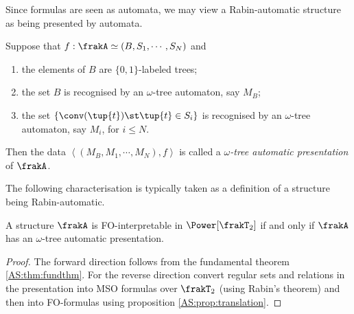 Since formulas are seen as automata, we may view a Rabin-automatic structure as being presented by automata.


\begin{definition} \label{AS:dfn:rap} 
Suppose that $f: \frakA \simeq  (B,S_1,\cdots,S_N)$ and
\begin{enumerate}
\item the elements of $B$ are $\{0,1\}$-labeled trees;
\item the set $B$ is recognised by an $\omega$-tree automaton, say $M_B$; 
\item the set $\{\conv(\tup{t}) \st \tup{t} \in S_i\}$ is recognised by an $\omega$-tree automaton, say $M_i$, for $i \leq N$.
\end{enumerate}
Then the data $\left<(M_B,M_1,\cdots,M_N), f \right>$ is called a {\em $\omega$-tree automatic presentation} of $\frakA$.
\end{definition}

The following characterisation is typically taken as a definition of a structure being Rabin-automatic. 

\begin{proposition}
A structure $\frakA$ is FO-interpretable in $\Power[\frakT_2]$ if and only if $\frakA$ has an $\omega$-tree automatic presentation.
\end{proposition}

\begin{proof}
The forward direction follows from the fundamental theorem \ref{AS:thm:fundthm}. For the reverse direction convert regular sets and relations in the presentation
into MSO formulas over $\frakT_2$ (using Rabin's theorem) and then into FO-formulas using  proposition \ref{AS:prop:translation}.
\end{proof}


